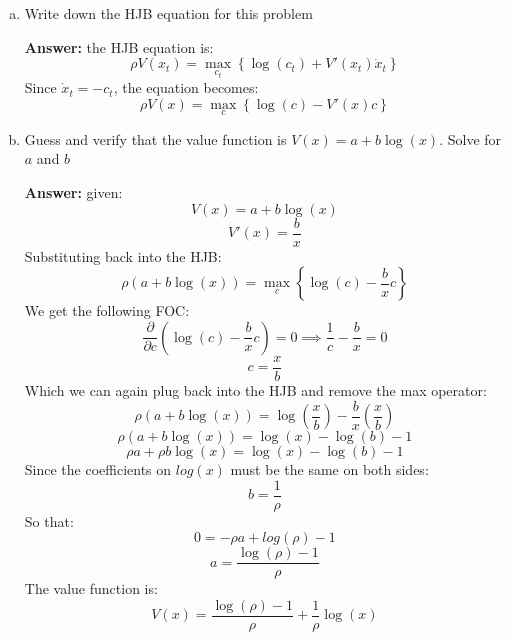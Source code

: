 \documentclass[11pt]{extarticle}
\theoremstyle{plain}
\theoremstyle{definition}
\begin{document}
\begin{enumerate}[(a)]
\item Write down the HJB equation for this problem

\textbf{Answer:} the HJB equation is:
\[
    \rho V(x_t) = \max_{c_t} \left\{ \log(c_t) + V'(x_t) \dot{x}_t \right\}
\]
Since $\dot{x}_t = - c_t$, the equation becomes:
\[
    \rho V(x) = \max_{c} \left\{ \log(c) - V'(x) c \right\}
\]

\item Guess and verify that the value function is $V(x) = a + b \log(x)$. Solve for $a$ and $b$


\textbf{Answer:} given:
\[
    V(x) = a + b \log(x)
\]
\[
    V'(x) = \frac{b}{x}
\]
Substituting back into the HJB:
\[
    \rho \left( a + b \log(x) \right) = \max_{c} \left\{ \log(c) - \frac{b}{x} c \right\}
\]
We get the following FOC:
\[
    \frac{\partial}{\partial c} \left( \log(c) - \frac{b}{x} c \right) = 0 \implies \frac{1}{c} - \frac{b}{x} = 0
\]
\[
    c = \frac{x}{b}
\]
Which we can again plug back into the HJB and remove the max operator:
\[
    \rho \left( a + b \log(x) \right) = \log\left( \frac{x}{b} \right) - \frac{b}{x} \left( \frac{x}{b} \right)
\]
\[
    \rho \left( a + b \log(x) \right) = \log(x) - \log(b) - 1
\]
\[
    \rho a + \rho b \log(x) = \log(x) - \log(b) - 1
\]
Since the coefficients on $log(x)$ must be the same on both sides:
$$b = \frac{1}{\rho}$$
So that:
\[
    0 = - \rho a + log(\rho) - 1
\]
$$a=\frac{ \log(\rho) - 1 }{ \rho }$$
The value function is:
\[
    V(x) = \frac{ \log(\rho) - 1 }{ \rho } + \frac{1}{\rho} \log(x)
\]
\end{enumerate}
\end{document}
